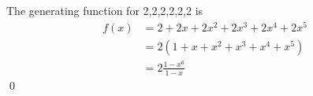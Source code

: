 The generating function for 2,2,2,2,2,2 is
\begin{align*}
f(x) &= 2 + 2x + 2x^2 + 2x^3 + 2x^4 + 2x^5 \\
     &= 2(1 + x + x^2 + x^3 + x^4 + x^5) \\
     &= 2 \frac{1 - x^6}{1 - x}
\end{align*}
\qed




